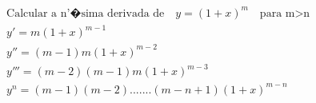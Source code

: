 \begin{ex}
\begin{align}
&\text{Calcular a n'�sima derivada de} \quad y=(1+x)^m \quad \text{para m>n}\nonumber\\
&y'=m(1+x)^{m-1}\nonumber\\
&y''=(m-1)m(1+x)^{m-2}\nonumber\\
&y'''=(m-2)(m-1)m(1+x)^{m-3}\nonumber\\
&y^{n}=(m-1)(m-2).......(m-n+1)(1+x)^{m-n}\nonumber
\end{align}
\end{ex}